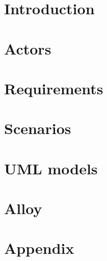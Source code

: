 \documentclass[a4paper]{article}
\begin{document}
\newpage
{}

\tableofcontents

\newpage

\section{Introduction}


\newpage

\section{Actors}


\newpage

\section{Requirements}


\newpage

\section{Scenarios}


\newpage

\section{UML models}


\newpage

\section{Alloy}


\newpage

\section{Appendix}

\end{document}
